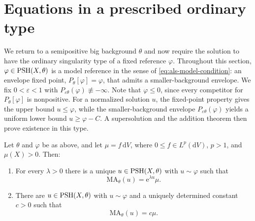 





















\section{Equations in a prescribed ordinary type}\label{sec:ordinary-type-equations}

We return to a semipositive big background $\theta$ and now require the solution to have the ordinary singularity type of a fixed reference $\varphi$. Throughout this section, $\varphi\in\mathrm{PSH}(X,\theta)$ is a model reference in the sense of \eqref{eq:als-model-condition}: an envelope fixed point, $P_\theta[\varphi]=\varphi$, that admits a smaller-background envelope. We fix $0<\varepsilon<1$ with $P_{\varepsilon\theta}(\varphi)\not\equiv-\infty$. Note that $\varphi\leq0$, since every competitor for $P_\theta[\varphi]$ is nonpositive. For a normalized solution $u$, the fixed-point property gives the upper bound $u\leq\varphi$, while the smaller-background envelope $P_{\varepsilon\theta}(\varphi)$ yields a uniform lower bound $u\geq\varphi-C$. A supersolution and the addition theorem then prove existence in this type.

\begin{theorem}
\label{thm:als-prescribed-lp}
Let $\theta$ and $\varphi$ be as above, and let $\mu=f\,\mathrm{d}V$, where $0\leq f\in L^p(\mathrm{d}V)$, $p>1$, and $\mu(X)>0$. Then:
\begin{enumerate}
\item For every $\lambda>0$ there is a unique $u\in\mathrm{PSH}(X,\theta)$ with $u\sim\varphi$ such that
\[
 \mathrm{MA}_\theta(u)=\mathrm{e}^{\lambda u}\mu.
\]
\item There are $u\in\mathrm{PSH}(X,\theta)$ with $u\sim\varphi$ and a uniquely determined constant $c>0$ such that
\[
 \mathrm{MA}_\theta(u)=c\mu.
\]
\end{enumerate}
\end{theorem}

